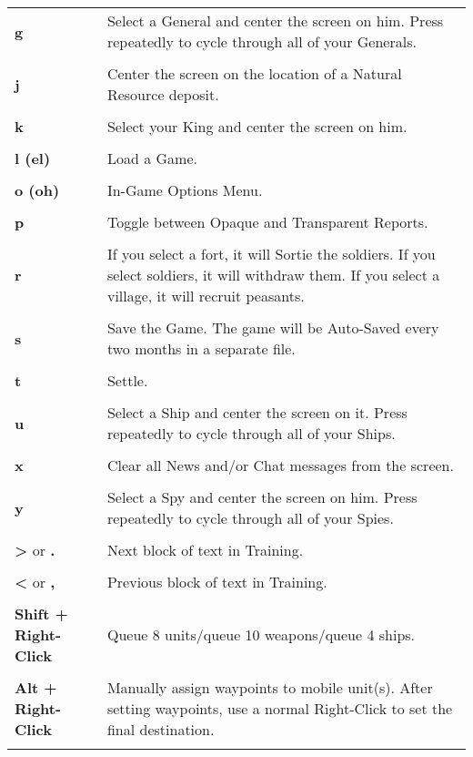\begin{longtable}{p{1in} p{3in}}
    \textbf{g} & Select a General and center the screen on him. Press repeatedly to cycle through all of your Generals.\\ \\    
    \textbf{j} & Center the screen on the location of a Natural Resource deposit.\\ \\    
    \textbf{k} & Select your King and center the screen on him.\\ \\
    \textbf{l (el)} & Load a Game.\\ \\
    \textbf{o (oh)} & In-Game Options Menu.\\ \\    
    \textbf{p} & Toggle between Opaque and Transparent Reports.\\ \\
%
%
    \textbf{r} & If you select a fort, it will Sortie the soldiers. If you select soldiers, it will withdraw them. If you select a village, it will recruit peasants.\\ \\    
    \textbf{s} & Save the Game. The game will be Auto-Saved every two months in a separate file.\\ \\        
    \textbf{t} & Settle.\\ \\    
    \textbf{u} & Select a Ship and center the screen on it. Press repeatedly to cycle through all of your Ships.\\ \\        
    \textbf{x} & Clear all News and/or Chat messages from the screen.\\ \\        
    \textbf{y} & Select a Spy and center the screen on him. Press repeatedly to cycle through all of your Spies.\\ \\
%
    \textbf{\textgreater} or \textbf{.} & Next block of text in Training.\\ \\        
    \textbf{\textless} or \textbf{,} & Previous block of text in Training.\\ \\    
    \textbf{Shift + Right-Click} & Queue 8 units/queue 10 weapons/queue 4 ships.\\ \\
    \textbf{Alt + Right-Click} & Manually assign waypoints to mobile unit(s). After setting waypoints, use a normal Right-Click to set the final destination.\\ \\
\end{longtable}

